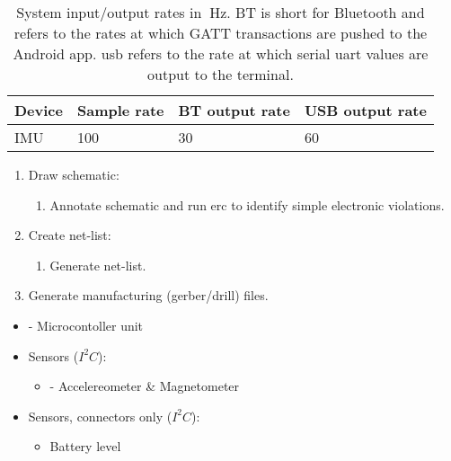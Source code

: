 \begin{table}[H]
\centering
\begin{tabular}{ l | l | l | l }
  Device 	& Sample rate & BT output rate 	& USB output rate\\\hline
  IMU 		& 100 		& 30 			& 60\\
\end{tabular}
\caption{System input/output rates in $~\textrm{Hz}$. BT is short for Bluetooth and refers to the rates at which GATT transactions are pushed to the Android app. \gls{usb} refers to the rate at which serial \gls{uart} values are output to the terminal.}
\label{table:systemrates}
\end{table}

\begin{enumerate}[noitemsep]
\item Draw schematic:
	\begin{enumerate}[noitemsep]
		\item Annotate schematic and run \gls{erc} to identify simple electronic violations.
	\end{enumerate}
\item Create net-list:
	\begin{enumerate}[noitemsep]
		\item Generate net-list.
	\end{enumerate}
\item Generate manufacturing (gerber/drill) files.
\end{enumerate}

\begin{itemize}[noitemsep]
\item{ - Microcontoller unit}
\item Sensors ($I^2C$):
	\begin{itemize}[noitemsep]
	\item{ - Accelereometer \& Magnetometer}
	\end{itemize}
\item Sensors, connectors only ($I^2C$):
	\begin{itemize}[noitemsep]
	\item Battery level
	\end{itemize}
\end{itemize}

